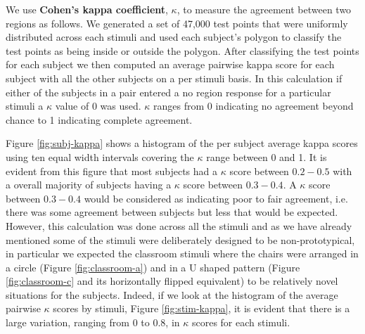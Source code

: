 \documentclass[11pt,letterpaper]{article}
\begin{document}

We use \textbf{Cohen's kappa coefficient}, $\kappa$, to measure the agreement between two regions as follows.  We generated a set of 47,000 test points that were uniformly distributed across each stimuli and used each subject's polygon to classify the test points as being inside or outside the polygon. After classifying the test points for each subject we then computed an average pairwise kappa score for each subject with all the other subjects on a per stimuli basis. In this calculation if either of the subjects in a pair entered a no region response for a particular stimuli a $\kappa$ value of 0 was used.  $\kappa$ ranges from 0 indicating no agreement beyond chance to 1 indicating complete agreement. 


Figure \ref{fig:subj-kappa} shows a histogram of the per subject average kappa scores using ten equal width intervals covering the $\kappa$ range between 0 and 1.  It is evident from this figure that most subjects had a $\kappa$ score between $0.2-0.5$ with a overall majority of subjects having a $\kappa$ score between $0.3-0.4$. A $\kappa$ score between $0.3-0.4$ would be considered as indicating poor to fair agreement, i.e. there was some agreement between subjects but less that would be expected. However, this calculation was done across all the stimuli and as we have already mentioned some of the stimuli were deliberately designed to be non-prototypical, in particular we expected the classroom stimuli where the chairs were arranged in a circle (Figure \ref{fig:classroom-a}) and in a U shaped pattern (Figure \ref{fig:classroom-c} and its horizontally flipped equivalent) to be relatively novel situations for the subjects. Indeed, if we look at the histogram of the average pairwise $\kappa$ scores by stimuli, Figure \ref{fig:stim-kappa}, it is evident that there is a large variation, ranging from $0$ to $0.8$, in $\kappa$ scores for each stimuli. 
\end{document}
